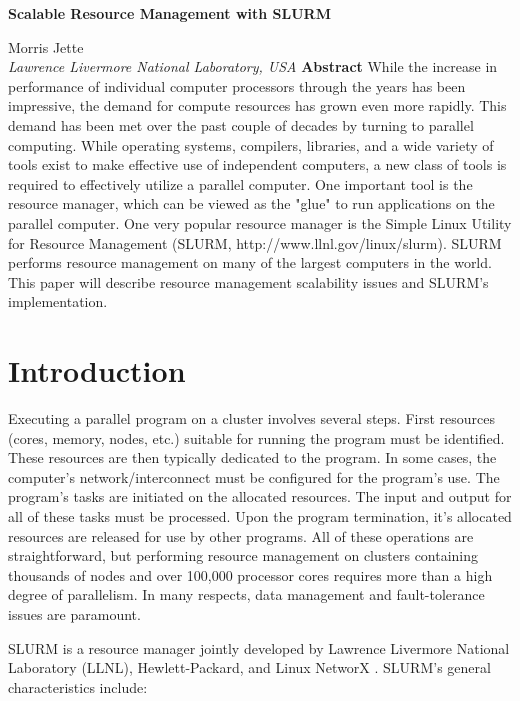 \documentclass[10pt,onecolumn,times]{../common/llncs}
\def\ctit{Scalable Resource Management with SLURM}
\def\ucrl{UCRL-JC-TBD}
\def\auth{Morris Jette}
\def\pubdate{January 23, 2006}
\def\journal{Operating Systems Reviews}
\begin{document}

\vspace*{35mm}
\noindent\Large
\textbf{\ctit}
\baselineskip
\noindent\large
{Morris Jette \\
{\em Lawrence Livermore National Laboratory, USA}
\baselineskip
\noindent\large
\textbf{Abstract}
\baselineskip
\noindent\normalsize
While the increase in performance of individual computer 
processors through the years has been impressive, the demand
for compute resources has grown even more rapidly. 
This demand has been met over the past couple of decades by 
turning to parallel computing. 
While operating systems, compilers, libraries, and a wide 
variety of tools exist to make effective use of independent 
computers, a new class of tools is required to effectively 
utilize a parallel computer. 
One important tool is the resource manager, which can be viewed 
as the "glue" to run applications on the parallel computer. 
One very popular resource manager is the Simple Linux
Utility for Resource Management (SLURM, 
http://www.llnl.gov/linux/slurm). 
SLURM performs resource management on many of the largest 
computers in the world.
This paper will describe resource management scalability 
issues and SLURM's implementation.


\section{Introduction}

Executing a parallel program on a cluster involves several 
steps. First resources (cores, memory, nodes, etc.) suitable 
for running the program must be identified. These resources 
are then typically dedicated to the program. In some 
cases, the computer's network/interconnect must be 
configured for the program's use. The program's tasks
are initiated on the allocated resources. The input and 
output for all of these tasks must be processed. 
Upon the program termination, it's allocated resources 
are released for use by other programs. 
All of these operations are straightforward, but performing 
resource management on clusters containing thousands of 
nodes and over 100,000 processor cores requires more 
than a high degree of parallelism.
In many respects, data management and fault-tolerance issues
are paramount.

SLURM is a resource manager jointly developed by Lawrence 
Livermore National Laboratory (LLNL), 
Hewlett-Packard, and Linux NetworX
\cite{SLURM2003,Yoo2003,SlurmWeb}.
SLURM's general characteristics include:

}
\end{document}
